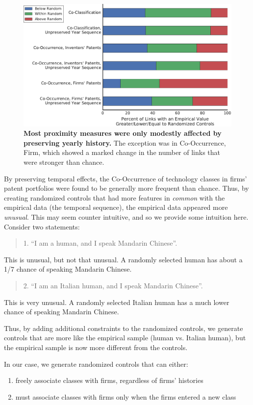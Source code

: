 \documentclass[]{svjour3}
\begin{document}
\begin{figure}[]
\centering
\includegraphics[width=.7\textwidth]{figs/CoOccurrence_Year_Preservation_Comparison_IPC.pdf} 
\caption{\textbf{Most proximity measures were only modestly affected by preserving yearly history.} The exception was in Co-Occurrence, Firm, which showed a marked change in the number of links that were stronger than chance.}\label{CoOccurrence_Year_Preservation_Comparison}
\end{figure}

By preserving temporal effects, the Co-Occurrence of technology classes in firms' patent portfolios were found to be generally more frequent than chance. Thus, by creating randomized controls that had more features in \textit{common} with the empirical data (the temporal sequence), the empirical data appeared more \textit{unusual}. This may seem counter intuitive, and so we provide some intuition here. Consider two statements:
\begin{quote}
1. ``I am a human, and I speak Mandarin Chinese''. 
\end{quote}
This is unusual, but not that unusual. A randomly selected human has about a 1/7 chance of speaking Mandarin Chinese.

\begin{quote}
2. ``I am an Italian human, and I speak Mandarin Chinese''.
\end{quote}
This is very unusual. A randomly selected Italian human has a much lower chance of speaking Mandarin Chinese.

Thus, by adding additional constraints to the randomized controls, we generate controls that are more like the empirical sample (human vs. Italian human), but the empirical sample is now more different from the controls.

In our case, we generate randomized controls that can either:
\begin{enumerate}
\item freely associate classes with firms, regardless of firms' histories
\item must associate classes with firms only when the firms entered a new class
\end{enumerate}
\end{document}
